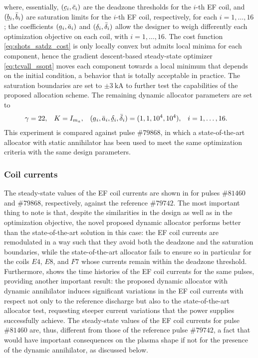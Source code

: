 where, essentially, $(\ubar{c}_i,\bar{c}_i)$ are the deadzone thresholds for the $i$-th EF coil, and $(\ubar{b}_i,\bar{b}_i)$ are saturation limits for the $i$-th EF coil, respectively, for each $i=1,\dotsc,16$; the coefficients $(\ubar{a}_i,\bar{a}_i)$ and $(\ubar{\delta}_i,\bar{\delta}_i)$ allow the designer to weigh differently each optimization objective on each coil, with $i=1,\dotsc,16$. The cost function \eqref{eq:shots_satdz_cost} is only locally convex but admits local minima for each component, hence the gradient descent-based steady-state optimizer \eqref{eq:tcvall_ssopt} moves each component towards a local minimum that depends on the initial condition, a behavior that is totally acceptable in practice. The saturation boundaries are set to $\pm\SI{3}{\kilo\ampere}$ to further test the capabilities of the proposed allocation scheme. The remaining dynamic allocator parameters are set to
\begin{align}
  \label{eq:shots_satdz_params}
  \gamma &= 22, & K &= I_{\bbreddeg}, & (\ubar{a}_i,\bar{a}_i,\ubar{\delta}_i,\bar{\delta}_i) &= (1,1,10^4,10^4), & i &= 1,\dotsc,16.
\end{align}
This experiment is compared against pulse $\#79868$, in which a state-of-the-art allocator with static annihilator has been used to meet the same optimization criteria with the same design parameters.

\subsubsection{Coil currents}
\label{sec:shots_satdz_currs}
The steady-state values of the EF coil currents are shown in  for pulses $\#81460$ and $\#79868$, respectively, against the reference $\#79742$. The most important thing to note is that, despite the similarities in the design as well as in the optimization objective, the novel proposed dynamic allocator performs better than the state-of-the-art solution in this case: the EF coil currents are remodulated in a way such that they avoid both the deadzone and the saturation boundaries, while the state-of-the-art allocator fails to ensure so in particular for the coils $E4$, $E8$, and $F7$ whose currents remain within the deadzone threshold. Furthermore,  shows the time histories of the EF coil currents for the same pulses, providing another important result: the proposed dynamic allocator with dynamic annihilator induces significant variations in the EF coil currents with respect not only to the reference discharge but also to the state-of-the-art allocator test, requesting steeper current variations that the power supplies successfully achieve. The steady-state values of the EF coil currents for pulse $\#81460$ are, thus, different from those of the reference pulse $\#79742$, a fact that would have important consequences on the plasma shape if not for the presence of the dynamic annihilator, as discussed below.

